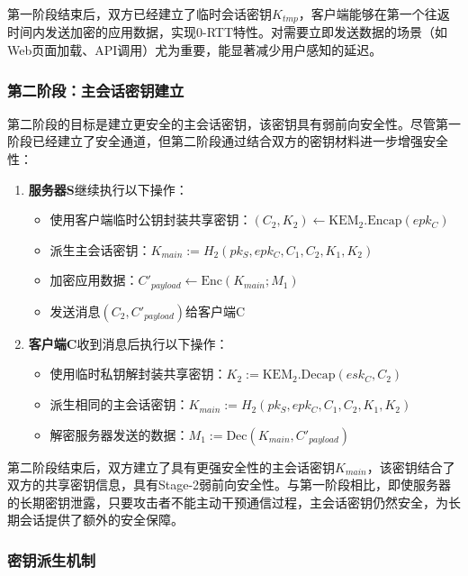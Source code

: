第一阶段结束后，双方已经建立了临时会话密钥$K_{tmp}$，客户端能够在第一个往返时间内发送加密的应用数据，实现0-RTT特性。对需要立即发送数据的场景（如Web页面加载、API调用）尤为重要，能显著减少用户感知的延迟。

\subsubsection{第二阶段：主会话密钥建立}

第二阶段的目标是建立更安全的主会话密钥，该密钥具有弱前向安全性。尽管第一阶段已经建立了安全通道，但第二阶段通过结合双方的密钥材料进一步增强安全性：
\begin{enumerate}
    \item \textbf{服务器S}继续执行以下操作：
    \begin{itemize}
        \item 使用客户端临时公钥封装共享密钥：$(C_2, K_2) \leftarrow \text{KEM}_2.\text{Encap}(epk_C)$
        \item 派生主会话密钥：$K_{main} := H_2(pk_S, epk_C, C_1, C_2, K_1, K_2)$
        \item 加密应用数据：$C'_{payload} \leftarrow \text{Enc}(K_{main}; M_1)$
        \item 发送消息$(C_2, C'_{payload})$给客户端C
    \end{itemize}

    \item \textbf{客户端C}收到消息后执行以下操作：
    \begin{itemize}
        \item 使用临时私钥解封装共享密钥：$K_2 := \text{KEM}_2.\text{Decap}(esk_C, C_2)$
        \item 派生相同的主会话密钥：$K_{main} := H_2(pk_S, epk_C, C_1, C_2, K_1, K_2)$
        \item 解密服务器发送的数据：$M_1 := \text{Dec}(K_{main}, C'_{payload})$
    \end{itemize}
\end{enumerate}

第二阶段结束后，双方建立了具有更强安全性的主会话密钥$K_{main}$，该密钥结合了双方的共享密钥信息，具有Stage-2弱前向安全性。与第一阶段相比，即使服务器的长期密钥泄露，只要攻击者不能主动干预通信过程，主会话密钥仍然安全，为长期会话提供了额外的安全保障。

\subsubsection{密钥派生机制}

